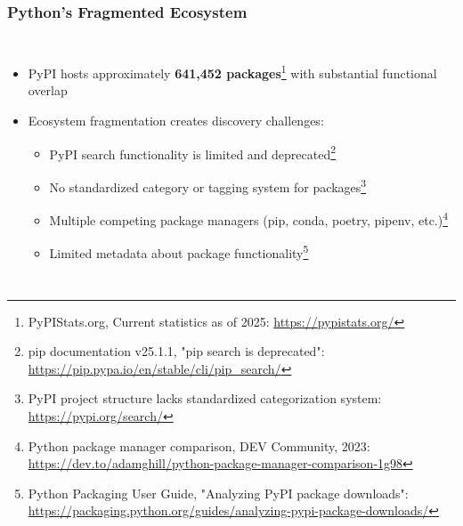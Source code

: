 \documentclass{beamer}
\begin{document}
\begin{frame}
\frametitle{Python's Fragmented Ecosystem}
\begin{columns}[T]

\begin{itemize}
\item PyPI hosts approximately \textbf{641,452 packages}\footnote{\tiny PyPIStats.org, Current statistics as of 2025: \url{https://pypistats.org/}} with substantial functional overlap
\item Ecosystem fragmentation creates discovery challenges:
  \begin{itemize}
  \item PyPI search functionality is limited and deprecated\footnote{\tiny pip documentation v25.1.1, "pip search is deprecated": \url{https://pip.pypa.io/en/stable/cli/pip_search/}}
  \item No standardized category or tagging system for packages\footnote{\tiny PyPI project structure lacks standardized categorization system: \url{https://pypi.org/search/}}
  \item Multiple competing package managers (pip, conda, poetry, pipenv, etc.)\footnote{\tiny Python package manager comparison, DEV Community, 2023: \url{https://dev.to/adamghill/python-package-manager-comparison-1g98}}
  \item Limited metadata about package functionality\footnote{\tiny Python Packaging User Guide, "Analyzing PyPI package downloads": \url{https://packaging.python.org/guides/analyzing-pypi-package-downloads/}}
  \end{itemize}
\end{itemize}

\end{columns}
\end{frame}
\end{document}
